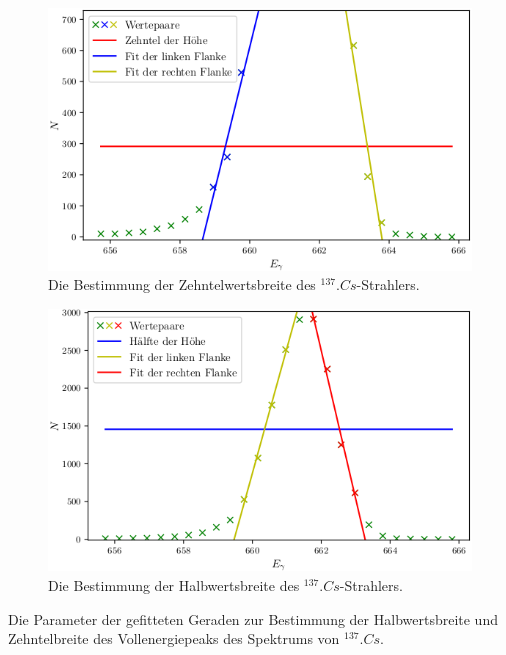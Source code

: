 \begin{figure}
	\centering
	\includegraphics[width=\linewidth-70pt,height=\textheight-70pt,keepaspectratio]{content/images/Cs137Zehntel.png}
	\caption{Die Bestimmung der Zehntelwertsbreite des $^{137}.{Cs}$-Strahlers.}
	\label{fig:10tel}
\end{figure}

\begin{figure}
	\centering
	\includegraphics[width=\linewidth-70pt,height=\textheight-70pt,keepaspectratio]{content/images/Cs137Halb.png}
	\caption{Die Bestimmung der Halbwertsbreite des $^{137}.{Cs}$-Strahlers.}
	\label{fig:2tel}
\end{figure}

\begin{table}
	\centering
	\caption{Die Parameter der gefitteten Geraden zur Bestimmung der Halbwertsbreite und Zehntelbreite des Vollenergiepeaks des Spektrums von $^{137}.{Cs}$.}
	
\end{table}

